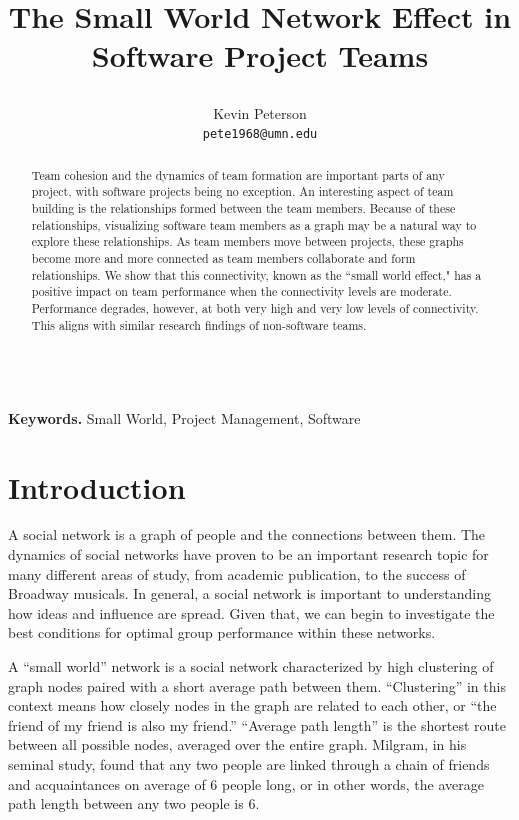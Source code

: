 \documentclass{proc}
\title{
The Small World Network Effect in Software Project Teams
\author{Kevin Peterson\\
\small \texttt{pete1968@umn.edu}
}
}
\begin{document}
\maketitle

\begin{abstract}
Team cohesion and the dynamics of team formation are important parts of any project, with software projects being no exception. An interesting aspect of team building is the relationships formed between the team members. Because of these relationships, visualizing software team members as a graph may be a natural way to explore these relationships. As team members move between projects, these graphs become more and more connected as team members collaborate and form relationships. We show that this connectivity, known as the ``small world effect," has a positive impact on team performance when the connectivity levels are moderate. Performance degrades, however, at both very high and very low levels of connectivity. This aligns with similar research findings of non-software teams.
\end{abstract}

\noindent \\\textbf{Keywords.} Small World, Project Management, Software

\section{Introduction}
A social network is a graph of people and the connections between them. The dynamics of social networks have proven to be an important research topic for many different areas of study, from academic publication\cite{barabasi2002evolution}, to the success of Broadway musicals\cite{uzzi2005collaboration}. In general, a social network is important to understanding how ideas and influence are spread\cite{kempe2003maximizing}. Given that, we can begin to investigate the best conditions for optimal group performance within these networks.

A ``small world'' network is a social network characterized by high clustering of graph nodes paired with a short average path between them\cite{watts1998collective}. ``Clustering'' in this context means how closely nodes in the graph are related to each other, or ``the friend of my friend is also my friend.'' ``Average path length'' is the shortest route between all possible nodes, averaged over the entire graph. Milgram, in his seminal study, found that any two people are linked through a chain of friends and acquaintances on average of 6 people long\cite{milgram1967small}, or in other words, the average path length between any two people is 6.
\end{document}
